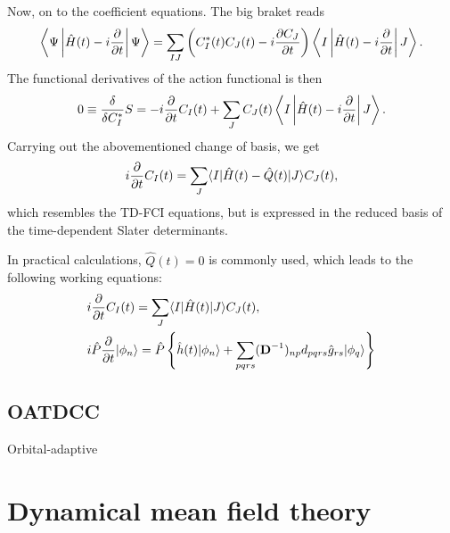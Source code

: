 \documentclass{article}
\begin{document}
Now, on to the coefficient equations. The big braket reads
\begin{equation}
    \left\bra\Psi\left|\hat{H}(t)-i\diffp{}{t}\right|\Psi\right\ket=\sum_{IJ}\left(C_I^*(t)C_J(t)-i\diffp{C_J}{t}\right)\left\bra I\left|\hat{H}(t)-i\diffp{}{t}\right|J\right\ket.
\end{equation}
The functional derivatives of the action functional is then
\begin{equation}
    0\equiv\frac{\delta}{\delta C_I^*}S=-i\diffp{}{t}C_I(t)+\sum_J C_J(t)\left\bra I\left|\hat{H}(t)-i\diffp{}{t}\right|J\right\ket.
\end{equation}
Carrying out the abovementioned change of basis, we get
\begin{equation}
    i\diffp{}{t}C_I(t)=\sum_J \bra I|\hat{H}(t)-\hat{Q}(t)|J\ket C_J(t),
\end{equation}
which resembles the TD-FCI equations, but is expressed in the reduced basis of the time-dependent Slater determinants.

\begin{definition}
In practical calculations, $\hat{Q}(t)=0$ is commonly used, which leads to the following working equations:
\begin{align}
    &i\diffp{}{t}C_I(t)=\sum_J \bra I|\hat{H}(t)|J\ket C_J(t),\\
    &i\hat{P}\diffp{}{t}|\phi_n\ket=\hat{P}\left\{ \hat{h}(t) |\phi_n\ket +\sum_{pqrs}(\bvec{D}^{-1})_{np}d_{pqrs}\hat{g}_{rs}|\phi_q\ket \right\}
\end{align}
    
\end{definition}

\subsection{OATDCC}
Orbital-adaptive

\section{Dynamical mean field theory}
\end{document}
